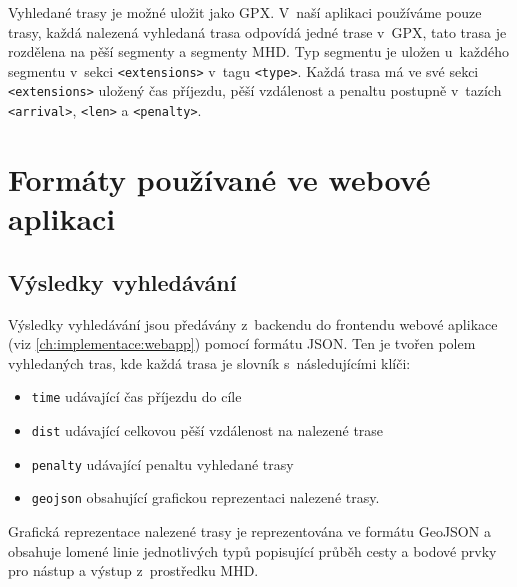 Vyhledané trasy je možné uložit jako GPX\cite{GPX}. V~naší aplikaci používáme pouze trasy, každá
nalezená vyhledaná trasa odpovídá jedné trase v~GPX, tato trasa je rozdělena na
pěší segmenty a segmenty MHD. Typ segmentu je uložen u~každého segmentu v~sekci
{\tt <extensions>} v~tagu {\tt <type>}. Každá trasa má ve své sekci {\tt
<extensions>} uložený čas příjezdu, pěší vzdálenost a penaltu postupně v~tazích
{\tt <arrival>}, {\tt <len>} a {\tt <penalty>}.

\section{Formáty používané ve webové aplikaci}
\subsection{Výsledky vyhledávání}
Výsledky vyhledávání jsou předávány z~backendu do frontendu webové aplikace
(viz \ref{ch:implementace:webapp}) pomocí formátu JSON. Ten je tvořen polem vyhledaných
tras, kde každá trasa je slovník s~následujícími klíči:
\begin{itemize}
	\item {\tt time} udávající čas příjezdu do cíle
	\item {\tt dist} udávající celkovou pěší vzdálenost na nalezené trase
	\item {\tt penalty} udávající penaltu vyhledané trasy
	\item {\tt geojson} obsahující grafickou reprezentaci nalezené trasy. 
\end{itemize}
Grafická reprezentace nalezené trasy je reprezentována ve formátu GeoJSON a
obsahuje lomené linie jednotlivých typů popisující průběh cesty a bodové prvky
pro nástup a výstup z~prostředku MHD.

